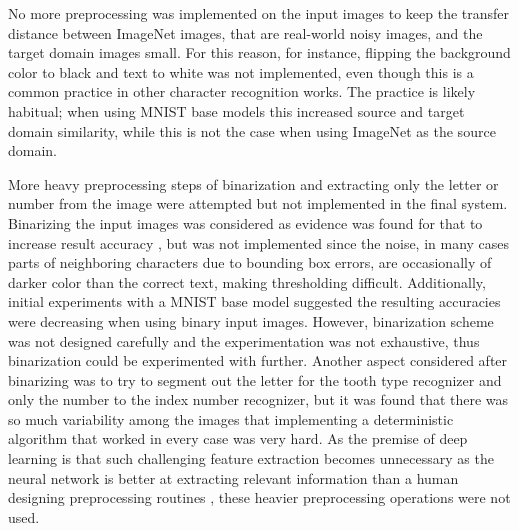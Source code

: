 \documentclass{article}
\begin{document}

No more preprocessing was implemented on the input images to keep the transfer distance between 
ImageNet images, that are real-world noisy images, and the target domain images small. For this reason, 
for instance, flipping the background color to black and text to white was not implemented, even though this 
is a common practice in other character recognition works. The practice is likely 
habitual; when using MNIST base models this increased source and target domain similarity,
while this is not the case when using ImageNet as the source domain.


More heavy preprocessing steps of binarization and extracting only the letter or number from the image were 
attempted but not implemented in the final system.
Binarizing the input images was considered as evidence was found for that to increase result accuracy \cite{9thuonPalm},
but was not implemented since the noise, in many cases
 parts of neighboring characters due to bounding box errors, are occasionally of darker 
color than the correct text, making thresholding difficult. Additionally,
 initial experiments with a MNIST base model suggested the resulting
accuracies were decreasing when using binary input images. However, binarization scheme was not designed carefully 
and the experimentation was not exhaustive, thus binarization could be experimented with further.
Another aspect considered after binarizing was to try to segment out the letter for the tooth type recognizer 
and only the number to the index number recognizer, but it was found that there was so much variability 
among the images that implementing a deterministic algorithm that worked in every case was very hard. 
As the premise of deep learning is that such challenging feature extraction becomes unnecessary as the neural 
network is better at extracting relevant information than a human designing preprocessing routines \cite{princebook}, these 
heavier preprocessing operations were not used.
\end{document}
